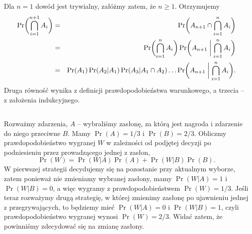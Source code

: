 Dla $n=1$ dowód jest trywialny, załóżmy zatem, że $n\ge1$. Otrzymujemy
\begin{eqnarray*}
	\Pr\biggl(\bigcap_{i=1}^{n+1}A_i\biggr) &=& \Pr\biggl(A_{n+1}\cap\bigcap_{i=1}^nA_i\biggr) \\
	&=& \Pr\biggl(\bigcap_{i=1}^nA_i\biggr)\Pr\biggl(A_{n+1}\biggm|\bigcap_{i=1}^nA_i\biggr) \\
	&=& \Pr(A_1)\Pr(A_2|A_1)\Pr(A_3|A_1\cap A_2)\ldots\Pr\biggl(A_{n+1}\biggm|\bigcap_{i=1}^nA_i\biggr).
\end{eqnarray*}
Druga równość wynika z definicji prawdopodobieństwa warunkowego, a trzecia -- z założenia indukcyjnego.

\subsection{} %
\subsection{} %
\subsection{} %
Rozważmy zdarzenia, $A$ -- wybraliśmy zasłonę, za którą jest nagroda i zdarzenie do niego przeciwne $B$. Mamy $\Pr(A)=1/3$ i $\Pr(B)=2/3$. Obliczmy prawdopodobieństwo wygranej $W$ w zależności od podjętej decyzji po podniesieniu przez prowadzącego jednej z zasłon,
\[
	\Pr(W) = \Pr(W|A)\Pr(A)+\Pr(W|B)\Pr(B).
\]
W pierwszej strategii decydujemy się na pozostanie przy aktualnym wyborze, zatem ponieważ nie zmieniamy wybranej zasłony, mamy $\Pr(W|A)=1$ i~$\Pr(W|B)=0$, a więc wygramy z prawdopodobieństwem $\Pr(W)=1/3$. Jeśli teraz rozważymy drugą strategię, w której zmienimy zasłonę po ujawnieniu jednej z przegrywających, to będziemy mieć $\Pr(W|A)=0$ i $\Pr(W|B)=1$, czyli prawdopodobieństwo wygranej wynosi $\Pr(W)=2/3$. Widać zatem, że powinniśmy zdecydować się na zmianę zasłony.

